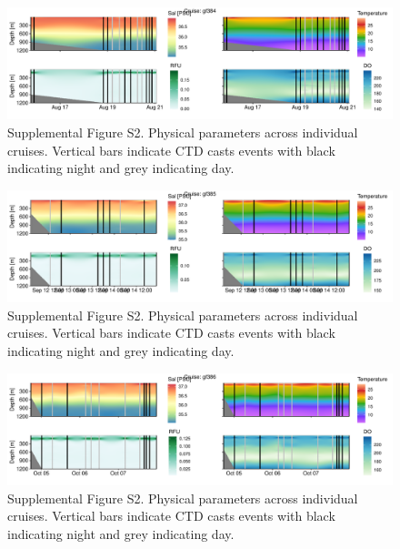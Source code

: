 \documentclass[
]{article}
\begin{document}
\begin{figure}

{\centering \includegraphics[width=1\textwidth,height=\textheight]{index_files/figure-pdf/unnamed-chunk-19-14.pdf}

}

\caption{Supplemental Figure S2. Physical parameters across individual
cruises. Vertical bars indicate CTD casts events with black indicating
night and grey indicating day.}

\end{figure}

\begin{figure}

{\centering \includegraphics[width=1\textwidth,height=\textheight]{index_files/figure-pdf/unnamed-chunk-19-15.pdf}

}

\caption{Supplemental Figure S2. Physical parameters across individual
cruises. Vertical bars indicate CTD casts events with black indicating
night and grey indicating day.}

\end{figure}

\begin{figure}

{\centering \includegraphics[width=1\textwidth,height=\textheight]{index_files/figure-pdf/unnamed-chunk-19-16.pdf}

}

\caption{Supplemental Figure S2. Physical parameters across individual
cruises. Vertical bars indicate CTD casts events with black indicating
night and grey indicating day.}

\end{figure}
\end{document}
